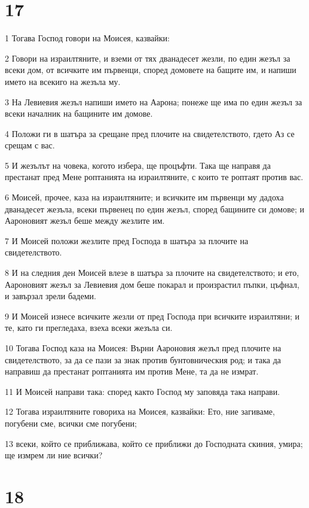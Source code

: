 \chapter{17}

\par 1 Тогава Господ говори на Моисея, казвайки:
\par 2 Говори на израилтяните, и вземи от тях дванадесет жезли, по един жезъл за всеки дом, от всичките им първенци, според домовете на бащите им, и напиши името на всекиго на жезъла му.
\par 3 На Левиевия жезъл напиши името на Аарона; понеже ще има по един жезъл за всеки началник на бащините им домове.
\par 4 Положи ги в шатъра за срещане пред плочите на свидетелството, гдето Аз се срещам с вас.
\par 5 И жезълът на човека, когото избера, ще процъфти. Така ще направя да престанат пред Мене роптанията на израилтяните, с които те роптаят против вас.
\par 6 Моисей, прочее, каза на израилтяните; и всичките им първенци му дадоха дванадесет жезъла, всеки първенец по един жезъл, според бащините си домове; и Аароновият жезъл беше между жезлите им.
\par 7 И Моисей положи жезлите пред Господа в шатъра за плочите на свидетелството.
\par 8 И на следния ден Моисей влезе в шатъра за плочите на свидетелството; и ето, Аароновият жезъл за Левиевия дом беше покарал и произрастил пъпки, цъфнал, и завързал зрели бадеми.
\par 9 И Моисей изнесе всичките жезли от пред Господа при всичките израилтяни; и те, като ги прегледаха, взеха всеки жезъла си.
\par 10 Тогава Господ каза на Моисея: Върни Аароновия жезъл пред плочите на свидетелството, за да се пази за знак против бунтовническия род; и така да направиш да престанат роптанията им против Мене, та да не измрат.
\par 11 И Моисей направи така: според както Господ му заповяда така направи.
\par 12 Тогава израилтяните говориха на Моисея, казвайки: Ето, ние загиваме, погубени сме, всички сме погубени;
\par 13 всеки, който се приближава, който се приближи до Господната скиния, умира; ще измрем ли ние всички?

\chapter{18}

